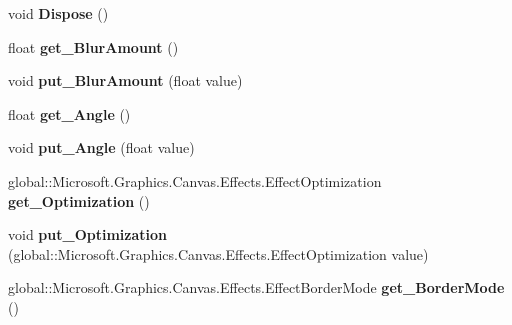 \begin{DoxyCompactItemize}
void {\bfseries Dispose} ()
\item 
\mbox{\label{class_microsoft_1_1_graphics_1_1_canvas_1_1_effects_1_1_directional_blur_effect_a43208f48efee475569eb87fb59bc9afc}} 
float {\bfseries get\+\_\+\+Blur\+Amount} ()
\item 
\mbox{\label{class_microsoft_1_1_graphics_1_1_canvas_1_1_effects_1_1_directional_blur_effect_af6383dc92843270529d3fe1da82d3f22}} 
void {\bfseries put\+\_\+\+Blur\+Amount} (float value)
\item 
\mbox{\label{class_microsoft_1_1_graphics_1_1_canvas_1_1_effects_1_1_directional_blur_effect_a8bdc7eff811b34db9a82120142b52a62}} 
float {\bfseries get\+\_\+\+Angle} ()
\item 
\mbox{\label{class_microsoft_1_1_graphics_1_1_canvas_1_1_effects_1_1_directional_blur_effect_a271e08d62a710392a1eb0425cf803992}} 
void {\bfseries put\+\_\+\+Angle} (float value)
\item 
\mbox{\label{class_microsoft_1_1_graphics_1_1_canvas_1_1_effects_1_1_directional_blur_effect_a34a41131fdf14b40d3d67a9a36936eb3}} 
global\+::\+Microsoft.\+Graphics.\+Canvas.\+Effects.\+Effect\+Optimization {\bfseries get\+\_\+\+Optimization} ()
\item 
\mbox{\label{class_microsoft_1_1_graphics_1_1_canvas_1_1_effects_1_1_directional_blur_effect_a497e67c7243081593b64fe7d0947243a}} 
void {\bfseries put\+\_\+\+Optimization} (global\+::\+Microsoft.\+Graphics.\+Canvas.\+Effects.\+Effect\+Optimization value)
\item 
\mbox{\label{class_microsoft_1_1_graphics_1_1_canvas_1_1_effects_1_1_directional_blur_effect_a8e1e8704473064ff603694cb02c0c78f}} 
global\+::\+Microsoft.\+Graphics.\+Canvas.\+Effects.\+Effect\+Border\+Mode {\bfseries get\+\_\+\+Border\+Mode} ()

\end{DoxyCompactItemize}
